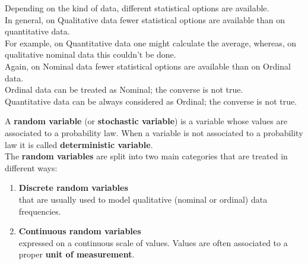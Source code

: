 \begin{frame}
  \vspace*{.15cm}
  Depending on the kind of data, different statistical options are available.\\
  \vspace*{.35cm}
  In general, on Qualitative data fewer statistical options are available than on quantitative data.\\
  \vspace*{.35cm}
  For example, on Quantitative data one might calculate the average, whereas, on qualitative nominal data this couldn't be done.\\ %
  \vspace*{.35cm}
  Again, on Nominal data fewer statistical options are available than on Ordinal data.\\
  \vspace*{.35cm}
  Ordinal data can be treated as Nominal; the converse is not true.\\
  \vspace*{.35cm}
  Quantitative data can be always considered as Ordinal; the converse is not true.\\
\end{frame}


\begin{frame}
  A \textbf{random variable} (or \textbf{stochastic variable}) is a variable whose values are associated to a probability law. When a variable is not associated to a probability law it is called \textbf{deterministic variable}. \\
  \vspace*{.15cm}
  The \textbf{random variables} are split into two main categories that are treated in different ways:
  \vspace*{.25cm}
  \begin{enumerate}
    \item \textbf{Discrete random variables} \\
      that are usually used to model qualitative (nominal or ordinal) data frequencies.\\ 
    \item \textbf{Continuous random variables} \\
      expressed on a continuous scale of values. Values are often associated to a proper \textbf{unit of measurement}.\\
  \end{enumerate}
\end{frame}

